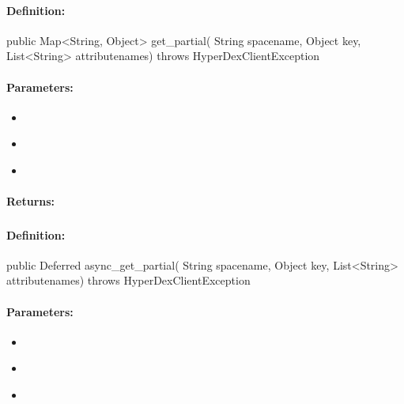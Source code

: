 \paragraph{Definition:}
\begin{javacode}
public Map<String, Object> get_partial(
        String spacename,
        Object key,
        List<String> attributenames) throws HyperDexClientException
\end{javacode}

\paragraph{Parameters:}
\begin{itemize}[noitemsep]
\item {}\\

\item {}\\

\item {}\\

\end{itemize}

\paragraph{Returns:}


\pagebreak
\subsubsection{}
\label{api:java:async_get_partial}


\paragraph{Definition:}
\begin{javacode}
public Deferred async_get_partial(
        String spacename,
        Object key,
        List<String> attributenames) throws HyperDexClientException
\end{javacode}

\paragraph{Parameters:}
\begin{itemize}[noitemsep]
\item {}\\

\item {}\\

\item {}\\

\end{itemize}

